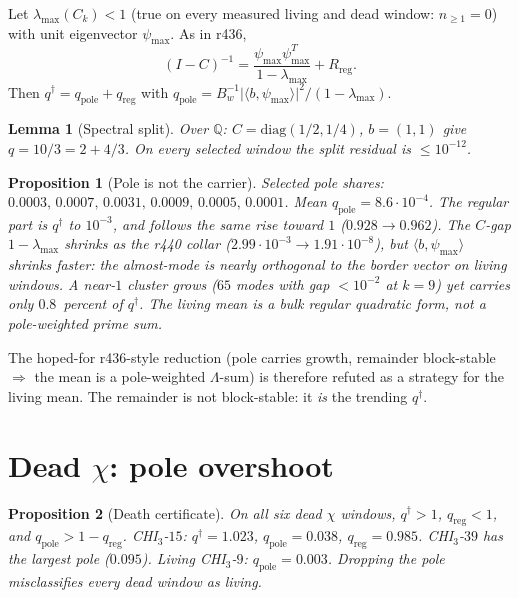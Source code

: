 \documentclass[11pt]{article}
\newtheorem{lemma}{Lemma}
\newtheorem{prop}{Proposition}
\theoremstyle{remark}
\newcommand{\qd}{q^{\dagger}}
\begin{document}
Let $\lambda_{\max}(C_k)<1$ (true on every measured living
and dead window: $n_{\ge 1}=0$) with unit eigenvector
$\psi_{\max}$.  As in r436,
\[
(I-C)^{-1}
=\frac{\psi_{\max}\psi_{\max}^{T}}{1-\lambda_{\max}}
+R_{\mathrm{reg}}.
\]
Then $\qd=q_{\mathrm{pole}}+q_{\mathrm{reg}}$ with
$q_{\mathrm{pole}}=B_w^{-1}\lvert\langle b,\psi_{\max}\rangle\rvert^{2}/(1-\lambda_{\max})$.

\begin{lemma}[Spectral split]\label{lem:pole}
Over $\mathbb{Q}$: $C=\mathrm{diag}(1/2,1/4)$, $b=(1,1)$
give $q=10/3=2+4/3$.
On every selected window the split residual is
$\le 10^{-12}$.
\end{lemma}

\begin{prop}[Pole is not the carrier]\label{prop:pole}
Selected pole shares:
$0.0003,\,0.0007,\,0.0031,\,0.0009,\,0.0005,\,0.0001$.
Mean $q_{\mathrm{pole}}=8.6\cdot 10^{-4}$.
The regular part \emph{is} $\qd$ to $10^{-3}$, and follows
the same rise toward $1$ ($0.928\to 0.962$).
The $C$-gap $1-\lambda_{\max}$ shrinks as the r440 collar
($2.99\cdot 10^{-3}\to 1.91\cdot 10^{-8}$), but
$\langle b,\psi_{\max}\rangle$ shrinks faster: the
almost-mode is nearly orthogonal to the border vector on
living windows.
A near-$1$ cluster grows ($65$ modes with gap $<10^{-2}$ at
$k=9$) yet carries only $0.8$~percent of $\qd$.
The living mean is a \emph{bulk regular} quadratic form,
not a pole-weighted prime sum.
\end{prop}

The hoped-for r436-style reduction (pole carries growth,
remainder block-stable $\Rightarrow$ the mean is a
pole-weighted $\Lambda$-sum) is therefore refuted as a
strategy for the living mean.  The remainder is not
block-stable: it \emph{is} the trending $\qd$.

\section{Dead $\chi$: pole overshoot}\label{sec:chi}

\begin{prop}[Death certificate]\label{prop:chi}
On all six dead $\chi$ windows,
$\qd>1$, $q_{\mathrm{reg}}<1$, and
$q_{\mathrm{pole}}>1-q_{\mathrm{reg}}$.
CHI$_3$-$15$: $\qd=1.023$, $q_{\mathrm{pole}}=0.038$,
$q_{\mathrm{reg}}=0.985$.
CHI$_3$-$39$ has the largest pole ($0.095$).
Living CHI$_3$-$9$: $q_{\mathrm{pole}}=0.003$.
Dropping the pole misclassifies every dead window as
living.
\end{prop}
\end{document}
